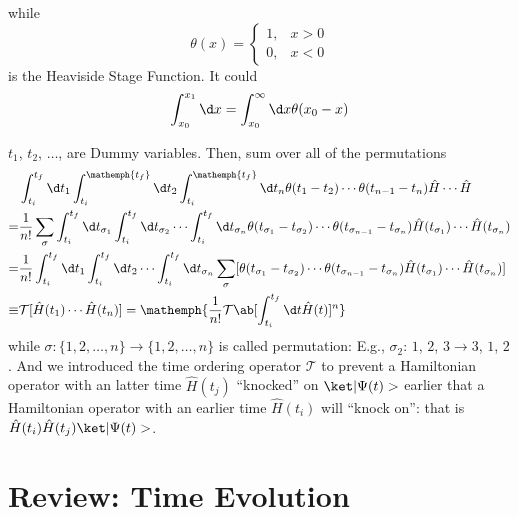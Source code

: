 while
\begin{equation}
  \theta(x) =
  \begin{cases}
    1, & x > 0\\
    0, & x < 0
  \end{cases}
\end{equation}
is the Heaviside Stage Function. It could
\begin{equation}
  \int_{x_0}^{x_1} \d x = \int_{x_0}^{\infty} \d x \theta(x_0 - x)
\end{equation}
\begin{center}
\end{center}
$t_1$, $t_2$, $\ldots$, are Dummy variables.
Then, sum over all of the  permutations
\begin{align*}
  & \int_{t_i}^{t_f} \d t_1
  \int_{t_i}^{\mathemph{t_f}} \d t_2
  \int_{t_i}^{\mathemph{t_f}} \d t_n
  \theta(t_1 - t_2) \cdots \theta(t_{n-1} - t_n)
  \hat H \cdots \hat H\\
  = & \frac1{n!} \sum_\sigma
  \int_{t_i}^{t_f} \d t_{\sigma_1}
  \int_{t_i}^{t_f} \d t_{\sigma_2}
  \cdots
  \int_{t_i}^{t_f} \d t_{\sigma_n}
  \theta(t_{\sigma_1} - t_{\sigma_2}) \cdots
  \theta(t_{\sigma_{n-1}} - t_{\sigma_n})
  \hat H(t_{\sigma_1}) \cdots
  \hat H(t_{\sigma_n})\\
  = & \frac1{n!}
  \int_{t_i}^{t_f} \d t_1
  \int_{t_i}^{t_f} \d t_2
  \cdots
  \int_{t_i}^{t_f} \d t_{\sigma_n} \sum_\sigma[
  \theta(t_{\sigma_1} - t_{\sigma_2}) \cdots
  \theta(t_{\sigma_{n-1}} - t_{\sigma_n})
  \hat H(t_{\sigma_1}) \cdots
  \hat H(t_{\sigma_n})]\\
\equiv & \mathcal T[\hat H(t_1) \cdots \hat H(t_n)]
= \mathemph{\frac1{n!} \mathcal T \ab[\int_{t_i}^{t_f} \d t \hat H(t)]^n}
\end{align*}
while $\sigma: \{1,2,\ldots,n\} \to \{1,2,\ldots,n\}$ is called permutation:
E.g., $\sigma_2$: $1$, $2$, $3 \to 3$, $1$, $2$.
And we introduced the time ordering operator $\mathcal T$ to prevent a Hamiltonian operator with an latter time $\hat H(t_j)$
``knocked'' on $\ket|\Psi(t)>$ earlier that
a Hamiltonian operator with an earlier time $\hat H(t_i)$ will ``knock on'':
that is
$\hat H(t_i) \hat H(t_j) \ket|\Psi(t)>$.

\section*{Review: Time Evolution}

